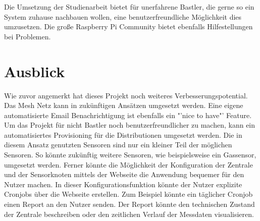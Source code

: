 	Die Umsetzung der Studienarbeit bietet für unerfahrene Bastler, die gerne so ein System zuhause nachbauen wollen, eine benutzerfreundliche Möglichkeit dies umzusetzen. Die große Raspberry Pi Community bietet ebenfalls Hilfestellungen bei Problemen.
	
\section{Ausblick}
	
	Wie zuvor angemerkt hat dieses Projekt noch weiteres Verbesserungspotential. Das Mesh Netz kann in zukünftigen Ansätzen umgesetzt werden. Eine eigene automatisierte Email Benachrichtigung ist ebenfalls ein "'nice to have"' Feature. Um das Projekt für nicht Bastler noch benutzerfreundlicher zu machen, kann ein automatisiertes Provisioning für die Distributionen umgesetzt werden. Die in diesem Ansatz genutzten Sensoren sind nur ein kleiner Teil der möglichen Sensoren. So könnte zukünftig weitere Sensoren, wie beispielsweise ein Gassensor, umgesetzt werden. Ferner könnte die Möglichkeit der Konfiguration der Zentrale und der Sensorknoten mittels der Webseite die Anwendung bequemer für den Nutzer machen. In dieser Konfigurationsfunktion könnte der Nutzer explizite Cronjobs über die Webseite erstellen. Zum Beispiel könnte ein täglicher Cronjob einen Report an den Nutzer senden. Der Report könnte den technischen Zustand der Zentrale beschreiben oder den zeitlichen Verlauf der Messdaten visualisieren.
	
